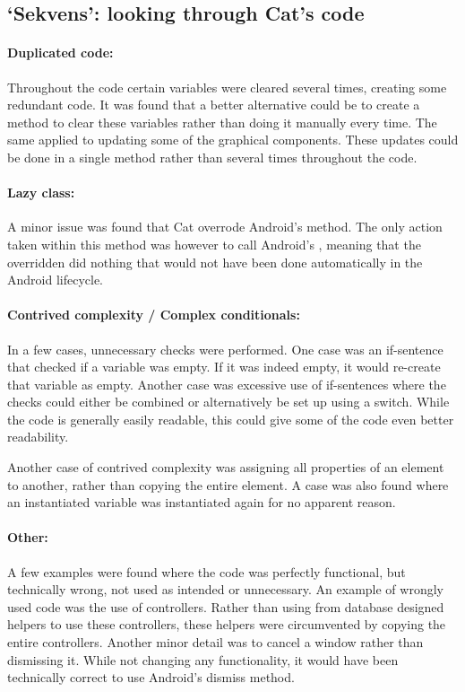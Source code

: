 \subsection{`Sekvens': looking through Cat's code}\label{subsec:collab_catcorrections}

\paragraph{Duplicated code:}
Throughout the code certain variables were cleared several times, creating some redundant code. It was found that a better alternative could be to create a method to clear these variables rather than doing it manually every time. The same applied to updating some of the graphical components. These updates could be done in a single method rather than several times throughout the code.

\paragraph{Lazy class:}
A minor issue was found that Cat overrode Android's  method. The only action taken within this method was however to call Android's , meaning that the overridden  did nothing that would not have been done automatically in the Android lifecycle.

\paragraph{Contrived complexity / Complex conditionals:}
In a few cases, unnecessary checks were performed. One case was an if-sentence that checked if a variable was empty. If it was indeed empty, it would re-create that variable as empty.
Another case was excessive use of if-sentences where the checks could either be combined or alternatively be set up using a switch.
While the code is generally easily readable, this could give some of the code even better readability.

Another case of contrived complexity was assigning all properties of an element to another, rather than copying the entire element.
A case was also found where an instantiated variable was instantiated again for no apparent reason.

\paragraph{Other:}
A few examples were found where the code was perfectly functional, but technically wrong, not used as intended or unnecessary.
An example of wrongly used code was the use of controllers. Rather than using from database designed helpers to use these controllers, these helpers were circumvented by copying the entire controllers.
Another minor detail was to cancel a window rather than dismissing it. While not changing any functionality, it would have been technically correct to use Android's dismiss method.

